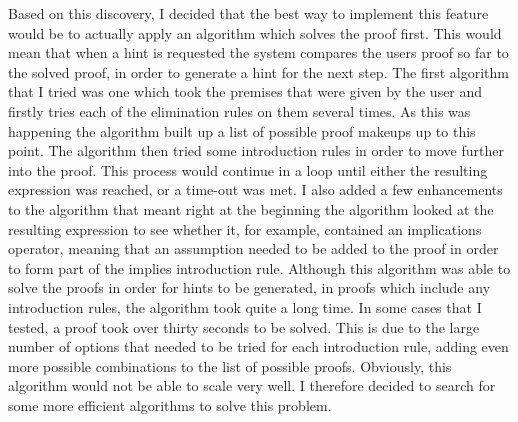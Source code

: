 Based on this discovery, I decided that the best way to implement this feature would be to actually apply an algorithm which solves the proof first. This would mean that when a hint is requested the system compares the users proof so far to the solved proof, in order to generate a hint for the next step. The first algorithm that I tried was one which took the premises that were given by the user and firstly tries each of the elimination rules on them several times. As this was happening the algorithm built up a list of possible proof makeups up to this point. The algorithm then tried some introduction rules in order to move further into the proof. This process would continue in a loop until either the resulting expression was reached, or a time-out was met. I also added a few enhancements to the algorithm that meant right at the beginning the algorithm looked at the resulting expression to see whether it, for example, contained an implications operator, meaning that an assumption needed to be added to the proof in order to form part of the implies introduction rule. Although this algorithm was able to solve the proofs in order for hints to be generated, in proofs which include any introduction rules, the algorithm took quite a long time. In some cases that I tested, a proof took over thirty seconds to be solved. This is due to the large number of options that needed to be tried for each introduction rule, adding even more possible combinations to the list of possible proofs. Obviously, this algorithm would not be able to scale very well. I therefore decided to search for some more efficient algorithms to solve this problem.

